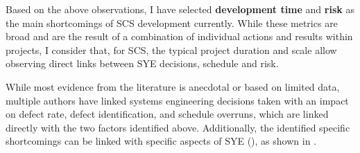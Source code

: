 \documentclass[a4paper,nobib,justified,final]{tufte-book}
\begin{document}
Based on the above observations, I have selected \textbf{development time} and \textbf{risk} as the main shortcomings of \acs{SCS} development currently. While these metrics are broad and are the result of a combination of individual actions and results within projects, I consider that, for \acs{SCS}, the typical project duration and scale allow observing direct links between \acl{SYE} decisions, schedule and risk.

While most evidence from the literature is anecdotal or based on limited data, multiple authors have linked systems engineering decisions taken with an impact on defect rate, defect identification, and schedule overruns, which are linked directly with the two factors identified above. Additionally, the identified specific shortcomings can be linked with specific aspects of \acl{SYE} (), as shown in .
\end{document}
